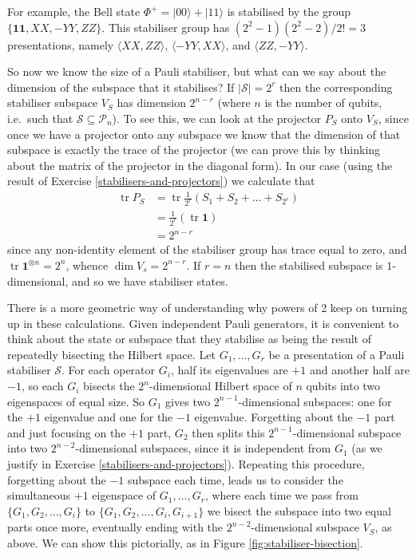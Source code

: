 \documentclass[fleqn]{article}
\begin{document}
For example, the Bell state \(\Phi^+=|00\rangle+|11\rangle\) is stabilised by the group \(\{\mathbf{1}\mathbf{1},XX,-YY,ZZ\}\).
This stabiliser group has \((2^2-1)(2^2-2)/2!=3\) presentations, namely \(\langle XX,ZZ\rangle\), \(\langle -YY,XX\rangle\), and \(\langle ZZ,-YY\rangle\).

So now we know the size of a Pauli stabiliser, but what can we say about the dimension of the subspace that it stabilises?
If \(|\mathcal{S}|=2^r\) then the corresponding stabiliser subspace \(V_S\) has dimension \(2^{n-r}\) (where \(n\) is the number of qubits, i.e.~such that \(\mathcal{S}\subseteq\mathcal{P}_n\)).
To see this, we can look at the projector \(P_S\) onto \(V_S\), since once we have a projector onto any subspace we know that the dimension of that subspace is exactly the trace of the projector (we can prove this by thinking about the matrix of the projector in the diagonal form).
In our case (using the result of Exercise \ref{stabilisers-and-projectors}) we calculate that
\[
  \begin{aligned}
    \operatorname{tr}P_S
    &= \operatorname{tr}\frac{1}{2^r}(S_1+S_2+\ldots+S_{2^r})
  \\&= \frac{1}{2^r}(\operatorname{tr}\mathbf{1})
  \\&= 2^{n-r}
  \end{aligned}
\]
since any non-identity element of the stabiliser group has trace equal to zero, and \(\operatorname{tr}\mathbf{1}^{\otimes n}=2^n\), whence \(\dim V_s=2^{n-r}\).
If \(r=n\) then the stabilised subspace is \(1\)-dimensional, and so we have stabiliser states.

There is a more geometric way of understanding why powers of 2 keep on turning up in these calculations.
Given independent Pauli generators, it is convenient to think about the state or subspace that they stabilise as being the result of repeatedly bisecting the Hilbert space.
Let \(G_1,\ldots,G_r\) be a presentation of a Pauli stabiliser \(\mathcal{S}\).
For each operator \(G_i\), half its eigenvalues are \(+1\) and another half are \(-1\), so each \(G_i\) bisects the \(2^n\)-dimensional Hilbert space of \(n\) qubits into two eigenspaces of equal size.
So \(G_1\) gives two \(2^{n-1}\)-dimensional subspaces: one for the \(+1\) eigenvalue and one for the \(-1\) eigenvalue.
Forgetting about the \(-1\) part and just focusing on the \(+1\) part, \(G_2\) then splits this \(2^{n-1}\)-dimensional subspace into two \(2^{n-2}\)-dimensional subspaces, since it is independent from \(G_1\) (as we justify in Exercise \ref{stabilisers-and-projectors}).
Repeating this procedure, forgetting about the \(-1\) subspace each time, leads us to consider the simultaneous \(+1\) eigenspace of \(G_1,\ldots,G_r\), where each time we pass from \(\{G_1,G_2,\ldots,G_i\}\) to \(\{G_1,G_2,\ldots,G_i,G_{i+1}\}\) we bisect the subspace into two equal parts once more, eventually ending with the \(2^{n-2}\)-dimensional subspace \(V_S\), as above.
We can show this pictorially, as in Figure \ref{fig:stabiliser-bisection}.
\end{document}
